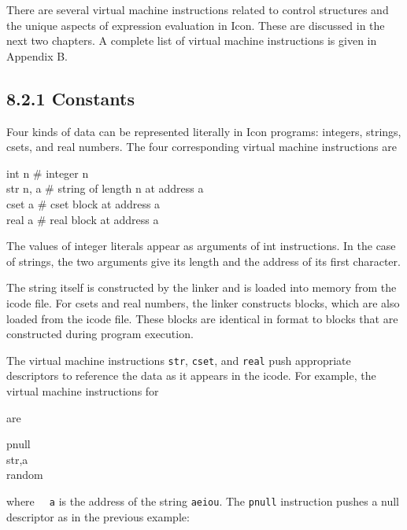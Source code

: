 There are several virtual machine instructions related to control
structures and the unique aspects of expression evaluation in
Icon. These are discussed in the next two chapters. A complete list of
virtual machine instructions is given in Appendix B.

\subsection[8.2.1 Constants]{8.2.1 Constants}

Four kinds of data can be represented literally in Icon programs:
integers, strings, csets, and real numbers. The four corresponding
virtual machine instructions are

\begin{iconcode}
\>  int  \>\>\>  n \>   \>\>\>\# integer n\\
\>  str  \>\>\>  n,\> a \>\>\>\# string of length n at address a\\
\>  cset \>\>\>  a \>   \>\>\>\# cset block at address a\\
\>  real \>\>\>  a \>   \>\>\>\# real block at address a
\end{iconcode}

The values of integer literals appear as arguments of int
instructions. In the case of strings, the two arguments give its
length and the address of its first character.

The string itself is constructed by the linker and is loaded into
memory from the icode file. For csets and real numbers, the linker
constructs blocks, which are also loaded from the icode file. These
blocks are identical in format to blocks that are constructed during
program execution.

The virtual machine instructions \texttt{str}, \texttt{cset}, and
\texttt{real} push appropriate descriptors to reference the data as it
appears in the icode. For example, the virtual machine instructions
for


\noindent are

\begin{iconcode}
\>   pnull \\
\>   str\>\>,\>a \\
\>   random
\end{iconcode}

\noindent where \texttt{\ \ a} is the address of the string
\texttt{{\textquotedbl}aeiou{\textquotedbl}}. The \texttt{pnull}
instruction pushes a null descriptor as in the previous example:

